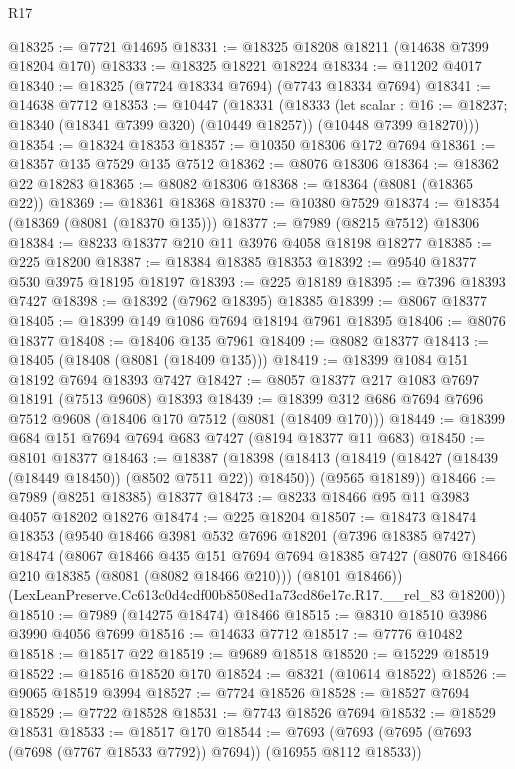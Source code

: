 \begin{lexlean}{R17}
\begin{coremodule}
@18325 := @7721 @14695
@18331 := @18325 @18208 @18211 (@14638 @7399 @18204 @170)
@18333 := @18325 @18221 @18224
@18334 := @11202 @4017
@18340 := @18325 (@7724 @18334 @7694) (@7743 @18334 @7694)
@18341 := @14638 @7712
@18353 := @10447
    (@18331
      (@18333
        (let scalar : @16 := @18237; @18340 (@18341 @7399 @320) (@10449 @18257))
        (@10448 @7399 @18270)))
@18354 := @18324 @18353
@18357 := @10350 @18306 @172 @7694
@18361 := @18357 @135 @7529 @135 @7512
@18362 := @8076 @18306
@18364 := @18362 @22 @18283
@18365 := @8082 @18306
@18368 := @18364 (@8081 (@18365 @22))
@18369 := @18361 @18368
@18370 := @10380 @7529
@18374 := @18354 (@18369 (@8081 (@18370 @135)))
@18377 := @7989 (@8215 @7512) @18306
@18384 := @8233 @18377 @210 @11 @3976 @4058 @18198 @18277
@18385 := @225 @18200
@18387 := @18384 @18385 @18353
@18392 := @9540 @18377 @530 @3975 @18195 @18197
@18393 := @225 @18189
@18395 := @7396 @18393 @7427
@18398 := @18392 (@7962 @18395) @18385
@18399 := @8067 @18377
@18405 := @18399 @149 @1086 @7694 @18194 @7961 @18395
@18406 := @8076 @18377
@18408 := @18406 @135 @7961
@18409 := @8082 @18377
@18413 := @18405 (@18408 (@8081 (@18409 @135)))
@18419 := @18399 @1084 @151 @18192 @7694 @18393 @7427
@18427 := @8057 @18377 @217 @1083 @7697 @18191 (@7513 @9608) @18393
@18439 := @18399 @312 @686 @7694 @7696 @7512 @9608 (@18406 @170 @7512 (@8081 (@18409 @170)))
@18449 := @18399 @684 @151 @7694 @7694 @683 @7427 (@8194 @18377 @11 @683)
@18450 := @8101 @18377
@18463 := @18387
    (@18398
      (@18413 (@18419 (@18427 (@18439 (@18449 @18450)) (@8502 @7511 @22)) @18450))
      (@9565 @18189))
@18466 := @7989 (@8251 @18385) @18377
@18473 := @8233 @18466 @95 @11 @3983 @4057 @18202 @18276
@18474 := @225 @18204
@18507 := @18473
    @18474
    @18353
    (@9540
      @18466
      @3981
      @532
      @7696
      @18201
      (@7396 @18385 @7427)
      @18474
      (@8067
        @18466
        @435
        @151
        @7694
        @7694
        @18385
        @7427
        (@8076 @18466 @210 @18385 (@8081 (@8082 @18466 @210)))
        (@8101 @18466))
      (LexLeanPreserve.Cc613c0d4cdf00b8508ed1a73cd86e17c.R17.__rel_83 @18200))
@18510 := @7989 (@14275 @18474) @18466
@18515 := @8310 @18510 @3986 @3990 @4056 @7699
@18516 := @14633 @7712
@18517 := @7776 @10482
@18518 := @18517 @22
@18519 := @9689 @18518
@18520 := @15229 @18519
@18522 := @18516 @18520 @170
@18524 := @8321 (@10614 @18522)
@18526 := @9065 @18519 @3994
@18527 := @7724 @18526
@18528 := @18527 @7694
@18529 := @7722 @18528
@18531 := @7743 @18526 @7694
@18532 := @18529 @18531
@18533 := @18517 @170
@18544 := @7693 (@7693 (@7695 (@7693 (@7698 (@7767 @18533 @7792)) @7694)) (@16955 @8112 @18533))

\end{coremodule}
\end{lexlean}
